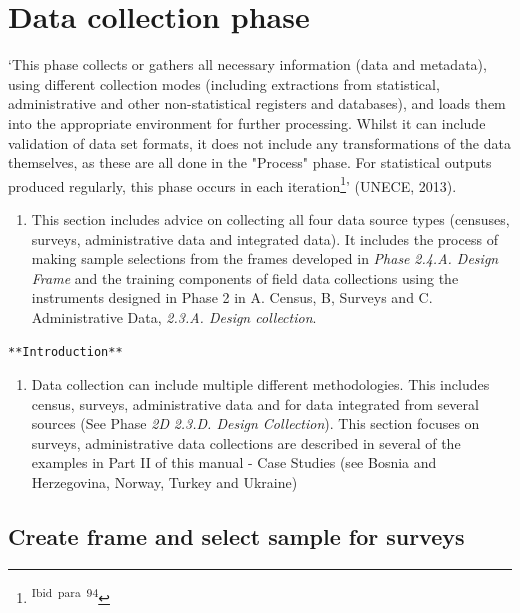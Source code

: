 \documentclass[
]{article}
\providecommand{\tightlist}{%
  \setlength{\itemsep}{0pt}\setlength{\parskip}{0pt}}
\begin{document}
\hypertarget{data-collection-phase-1}{%
\section{Data collection phase}\label{data-collection-phase-1}}

`This phase collects or gathers all necessary information (data and
metadata), using different collection modes (including extractions from
statistical, administrative and other non-statistical registers and
databases), and loads them into the appropriate environment for further
processing. Whilst it can include validation of data set formats, it
does not include any transformations of the data themselves, as these
are all done in the "Process" phase. For statistical outputs produced
regularly, this phase occurs in each iteration\footnote{\textsuperscript{Ibid~para~94}}' (UNECE, 2013).

\begin{enumerate}
\def\labelenumi{\arabic{enumi}.}
\setcounter{enumi}{317}
\tightlist
\item
  This section includes advice on collecting all four data source
  types (censuses, surveys, administrative data and integrated data).
  It includes the process of making sample selections from the frames
  developed in \emph{Phase} \emph{2.4.A. Design Frame} and the training
  components of field data collections using the instruments designed
  in Phase 2 in A. Census, B, Surveys and C. Administrative Data,
  \emph{2.3.A. Design collection}.
\end{enumerate}

\begin{verbatim}
**Introduction**
\end{verbatim}

\begin{enumerate}
\def\labelenumi{\arabic{enumi}.}
\setcounter{enumi}{318}
\tightlist
\item
  Data collection can include multiple different methodologies. This
  includes census, surveys, administrative data and for data
  integrated from several sources (See Phase \emph{2D} \emph{2.3.D. Design
  Collection}). This section focuses on surveys, administrative data
  collections are described in several of the examples in Part II of
  this manual - Case Studies (see Bosnia and Herzegovina, Norway,
  Turkey and Ukraine)
\end{enumerate}

\hypertarget{create-frame-and-select-sample-for-surveys-1}{%
\subsection{Create frame and select sample for surveys}\label{create-frame-and-select-sample-for-surveys-1}}
\end{document}
